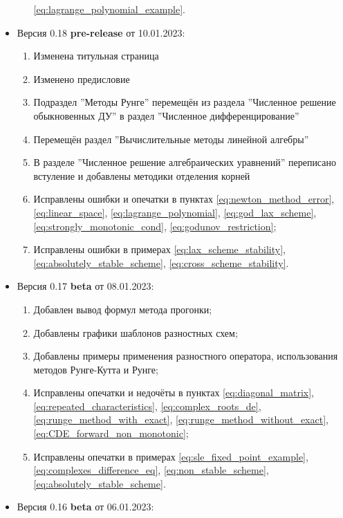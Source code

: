 \documentclass{article}
\begin{document}
\begin{itemize}[nosep]
\begin{enumerate}[nosep]
			\eqref{eq:lagrange_polynomial_example}.
	\end{enumerate}
\item Версия 0.18 \textbf{pre-release} от 10.01.2023:
	\begin{enumerate}[nosep]
		\item Изменена титульная страница
		\item Изменено предисловие
		\item Подраздел ''Методы Рунге'' перемещён из раздела
			''Численное решение обыкновенных ДУ'' в раздел
			''Численное дифференцирование''
		\item Перемещён раздел ''Вычислительные методы линейной
			алгебры''
		\item В разделе ''Численное решение алгебраических уравнений''
			переписано встуление и добавлены методики отделения
			корней
		\item Исправлены ошибки и опечатки в пунктах
			\eqref{eq:newton_method_error},
			\eqref{eq:linear_space},
			\eqref{eq:lagrange_polynomial}, 
			\eqref{eq:god_lax_scheme},
			\eqref{eq:strongly_monotonic_cond},
			\eqref{eq:godunov_restriction};
		\item Исправлены ошибки в примерах
			\eqref{eq:lax_scheme_stability},
			\eqref{eq:absolutely_stable_scheme},
			\eqref{eq:cross_scheme_stability}.
	\end{enumerate}
\item Версия 0.17 \textbf{beta} от 08.01.2023:
	\begin{enumerate}[nosep]
		\item Добавлен вывод формул метода прогонки;
		\item Добавлены графики шаблонов разностных схем;
		\item Добавлены примеры применения разностного оператора,
			использования методов Рунге-Кутта и Рунге;
		\item Исправлены опечатки и недочёты в пунктах
			\eqref{eq:diagonal_matrix},
			\eqref{eq:repeated_characteristics},
			\eqref{eq:complex_roots_de},
			\eqref{eq:runge_method_with_exact},
			\eqref{eq:runge_method_without_exact},
			\eqref{eq:CDE_forward_non_monotonic};
		\item Исправлены опечатки в примерах
			\eqref{eq:sle_fixed_point_example},
			\eqref{eq:complexes_difference_eq},
			\eqref{eq:non_stable_scheme},
			\eqref{eq:absolutely_stable_scheme}.
	\end{enumerate}
\item Версия 0.16 \textbf{beta} от 06.01.2023:
	\begin{enumerate}[nosep]

\end{enumerate}
\end{itemize}
\end{document}
